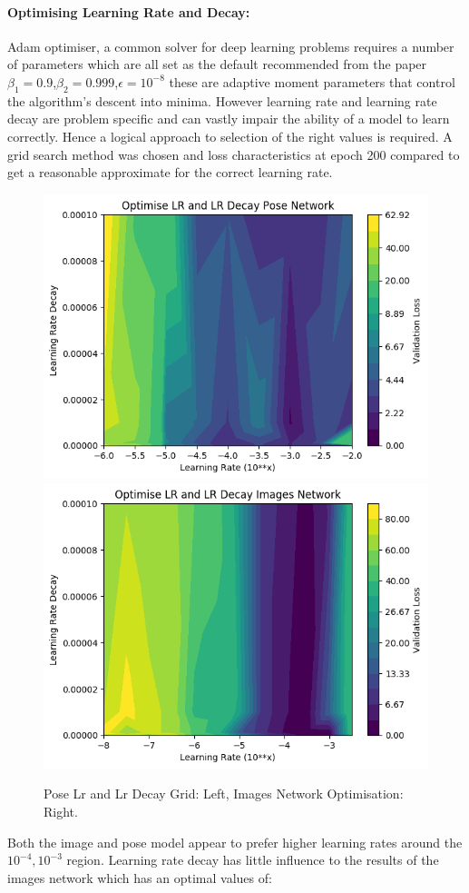 \documentclass[11pt,twoside]{report}
\begin{document}
\paragraph{Optimising Learning Rate and Decay:}
Adam optimiser, a common solver for deep learning problems requires a number of parameters which are all set as the default recommended from the paper \cite{DBLP:journals/corr/KingmaB14} $\beta_{1}=0.9$,$\beta_{2}=0.999$,$\epsilon=10^{-8}$ these are adaptive moment parameters that control the algorithm's descent into minima. However learning rate and learning rate decay are problem specific and can vastly impair the ability of a model to learn correctly. Hence a logical approach to selection of the right values is required. A grid search method was chosen and loss characteristics at epoch 200 compared to get a reasonable approximate for the correct learning rate.


\noindent \begin{figure}[h!]
	\includegraphics[width = 0.5\hsize]{figures/pose_lr_lr_decay_graph_.png}
	\includegraphics[width = 0.5\hsize]{figures/images_lr_lr_decay_graph_.png}
	\caption{Pose Lr and Lr Decay Grid: Left, Images Network Optimisation: Right.}
	\label{lr_and_decay_grid}
\end{figure}

Both the image and pose model appear to prefer higher learning rates around the $10^{-4},10^{-3}$ region. Learning rate decay has little influence to the results of the images network which has an optimal values of:
\end{document}
